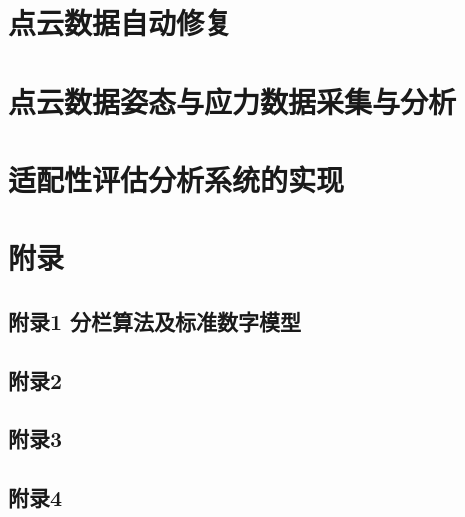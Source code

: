 \documentclass[a4paper,12pt]{ctexbook}	%
\begin{document}
\chapter{点云数据自动修复}

\chapter{点云数据姿态与应力数据采集与分析}

\chapter{适配性评估分析系统的实现}



\backmatter %


\chapter{附录}

\setcounter{secnumdepth}{0}   %
\section{附录1 分栏算法及标准数字模型}
\section{附录2 }
\section{附录3 }
\section{附录4 }
\end{document}
